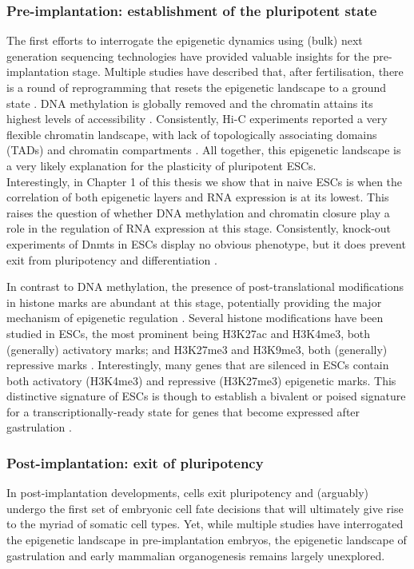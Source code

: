 \subsubsection{Pre-implantation: establishment of the pluripotent state}
The first efforts to interrogate the epigenetic dynamics using (bulk) next generation sequencing technologies have provided valuable insights for the pre-implantation stage. Multiple studies have described that, after fertilisation, there is a round of reprogramming that resets the epigenetic landscape to a ground state \cite{Smith2012,XXX}. DNA methylation is globally removed and the chromatin attains its highest levels of accessibility \cite{Wu2016}. Consistently, Hi-C experiments reported a very flexible chromatin landscape, with lack of topologically associating domains (TADs) and chromatin compartments \cite{Ke2017,Du2017,Tee2014}. All together, this  epigenetic landscape is a very likely explanation for the plasticity of pluripotent ESCs.\\
Interestingly, in Chapter 1 of this thesis we show that in naive ESCs is when the correlation of both epigenetic layers and RNA expression is at its lowest. This raises the question of whether DNA methylation and chromatin closure play a role in the regulation of RNA expression at this stage. Consistently, knock-out experiments of Dnmts in ESCs display no obvious phenotype, but it does prevent exit from pluripotency and differentiation \cite{XXX}.

In contrast to DNA methylation, the presence of post-translational modifications in histone marks are abundant at this stage, potentially providing the major mechanism of epigenetic regulation \cite{Hanna2018,Tee2014}. Several histone modifications have been studied in ESCs, the most prominent being H3K27ac and H3K4me3, both (generally) activatory marks; and H3K27me3 and H3K9me3, both (generally) repressive marks \cite{Zhao2015}. Interestingly, many genes that are silenced in ESCs contain both activatory (H3K4me3) and repressive (H3K27me3) epigenetic marks. This distinctive signature of ESCs is though to establish a bivalent or poised signature for a transcriptionally-ready state for genes that become expressed after gastrulation \cite{Bernstein2006,Tee2014}. 


\subsubsection{Post-implantation: exit of pluripotency}
In post-implantation developments, cells exit pluripotency and (arguably) undergo the first set of embryonic cell fate decisions that will ultimately give rise to the myriad of somatic cell types. Yet, while multiple studies have interrogated the epigenetic landscape in pre-implantation embryos, the epigenetic landscape of gastrulation and early mammalian organogenesis remains largely unexplored.\\

